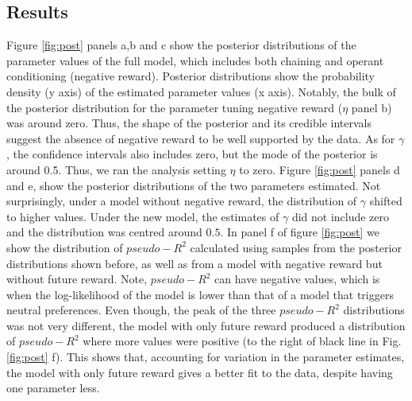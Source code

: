 \documentclass[]{rsos}%
\begin{document}
\hypertarget{results}{%
\subsection{Results}\label{results}}












Figure \ref{fig:post} panels a,b and c show the posterior distributions
of the parameter values of the full model, which includes both chaining
and operant conditioning (negative reward). Posterior distributions show the probability
density (y axis) of the estimated parameter values (x axis). Notably,
the bulk of the posterior distribution for the parameter tuning negative
reward (\(\eta\) panel b) was around zero. Thus, the shape of the posterior
and its credible intervals suggest the absence of negative reward to be
well supported by the data. As for \(\gamma\), the confidence intervals
also includes zero, but the mode of the posterior is around 0.5. Thus,
we ran the analysis setting \(\eta\) to zero. Figure \ref{fig:post} panels
d and e, show the posterior distributions of the two parameters
estimated. Not surprisingly, under a model without negative reward, the
distribution of \(\gamma\) shifted to higher values. Under the new model,
the estimates of \(\gamma\) did not include zero and the distribution was
centred around \(0.5\). In panel f of figure \ref{fig:post}
we show the distribution of \(pseudo-R^2\) calculated using
samples from the posterior distributions shown before,
as well as from a model with negative reward but without
future reward. Note, \(pseudo-R^2\) can have negative values, which is when
the log-likelihood of the model is lower than that of a model that
triggers neutral preferences. Even though, the peak of the three
\(pseudo-R^2\) distributions was not very different, the model with only
future reward produced a distribution of \(pseudo-R^2\) where more values
were positive (to the right of black line in Fig. \ref{fig:post} f). This
shows that, accounting for variation in the parameter estimates, the
model with only future reward gives a better fit to the data, despite
having one parameter less.
\end{document}
